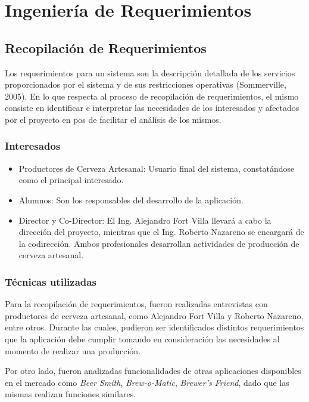 \chapter{Ingeniería de Requerimientos}
\section{Recopilación de Requerimientos}
    \par
    Los requerimientos para un sistema son la descripción detallada de los servicios proporcionados por el sistema y de sus restricciones operativas (Sommerville, 2005). En lo que respecta al proceso de recopilación de requerimientos, el mismo consiste en identificar e interpretar las necesidades de los interesados y afectados por el proyecto en pos de facilitar el análisis de los mismos.
    
    \subsection{Interesados}
    \begin{itemize}
        \item Productores de Cerveza Artesanal: Usuario final del sistema, constatándose como el principal interesado.
        \item Alumnos: Son los responsables del desarrollo de la aplicación.
        \item Director y Co-Director: El Ing. Alejandro Fort Villa llevará a cabo la dirección del proyecto, mientras que el Ing. Roberto Nazareno se encargará de la codirección. Ambos profesionales desarrollan actividades de producción de cerveza artesanal.
    \end{itemize}
    
    \subsection{Técnicas utilizadas}
    \par
    Para la recopilación de requerimientos, fueron realizadas entrevistas con productores de cerveza artesanal, como Alejandro Fort Villa y Roberto Nazareno, entre otros. Durante las cuales, pudieron ser identificados distintos requerimientos que la aplicación debe cumplir tomando en consideración las necesidades al momento de realizar una producción. 
    \par
    Por otro lado, fueron analizadas funcionalidades de otras aplicaciones disponibles en el mercado como \textit{Beer Smith}\textsuperscript{\textregistered}, \textit{Brew-o-Matic}\textsuperscript{\textregistered}, \textit{Brewer’s Friend}\textsuperscript{\textregistered}, dado que las mismas realizan funciones similares.
    

